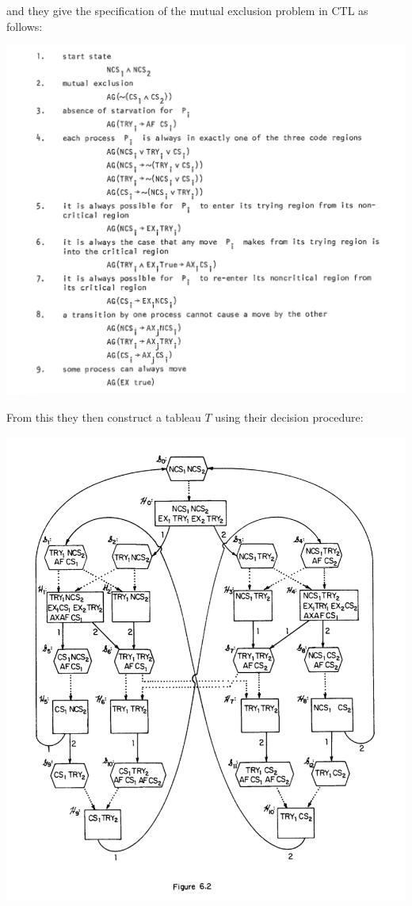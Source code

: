 \documentclass[10pt,a4paper]{article}
\begin{document}
and they give the specification of the mutual exclusion problem in CTL as follows:
\begin{center}
    \includegraphics[scale=0.45]{images/mutex_spec.png}
\end{center}
From this they then construct a tableau $T$ using their decision procedure:
\begin{center}
    \includegraphics[scale=0.4]{images/mutex_tableau.png}
\end{center}
\end{document}
